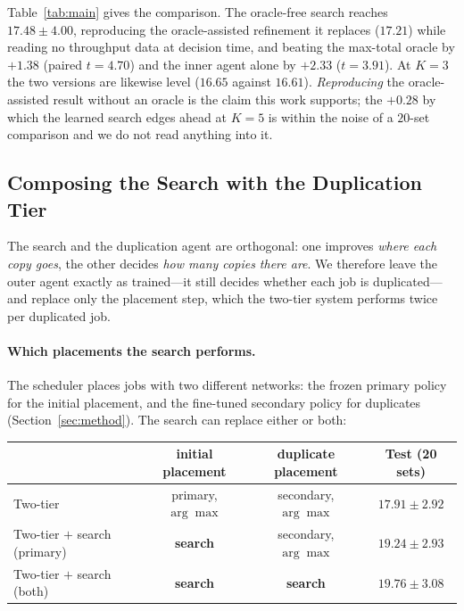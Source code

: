 \documentclass{article}
\begin{document}
Table~\ref{tab:main} gives the comparison. The oracle-free search reaches
$17.48 \pm 4.00$, reproducing the oracle-assisted refinement it replaces
($17.21$) while reading no throughput data at decision time, and beating the
max-total oracle by $+1.38$ (paired $t = 4.70$) and the inner agent alone by
$+2.33$ ($t = 3.91$). At $K{=}3$ the two versions are likewise level ($16.65$
against $16.61$). \emph{Reproducing} the oracle-assisted result without an oracle
is the claim this work supports; the $+0.28$ by which the learned search edges
ahead at $K{=}5$ is within the noise of a $20$-set comparison and we do not read
anything into it.

\subsection{Composing the Search with the Duplication Tier}
\label{sec:composition}

The search and the duplication agent are orthogonal: one improves \emph{where each
copy goes}, the other decides \emph{how many copies there are}. We therefore leave
the outer agent exactly as trained---it still decides whether each job is
duplicated---and replace only the placement step, which the two-tier system
performs twice per duplicated job.

\paragraph{Which placements the search performs.}
The scheduler places jobs with two different networks: the frozen primary policy for the
initial placement, and the fine-tuned secondary policy for duplicates
(Section~\ref{sec:method}). The search can replace either or both:

\begin{center}
\small
\begin{tabular}{lccc}
\toprule
 & initial placement & duplicate placement & Test (20 sets) \\
\midrule
Two-tier                       & primary, $\arg\max$ & secondary, $\arg\max$ & $17.91 \pm 2.92$ \\
Two-tier $+$ search (primary)  & \textbf{search}     & secondary, $\arg\max$ & $19.24 \pm 2.93$ \\
Two-tier $+$ search (both)     & \textbf{search}     & \textbf{search}       & $\mathbf{19.76 \pm 3.08}$ \\
\bottomrule
\end{tabular}
\end{center}
\end{document}
